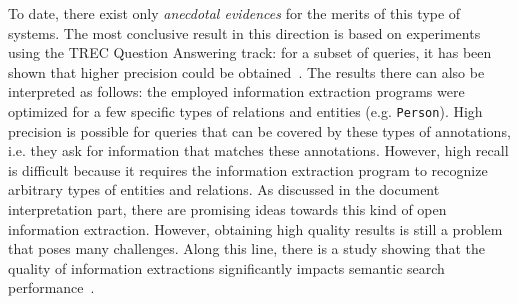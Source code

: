 To date, there exist only \emph{anecdotal evidences} for the merits of this type of systems. 
The most conclusive result in this direction is based on experiments using the TREC Question Answering track: for a subset of queries, it has been shown that higher precision could be obtained~\cite{DBLP:conf/sigir/Chu-CarrollPCFD06}. The results there can also be interpreted as follows: the employed information extraction programs were optimized for a few specific types of relations and entities (e.g. \verb+Person+). High precision is possible for queries that can be covered by these types of annotations, i.e. they ask for information that matches these annotations. However, high recall is difficult because it requires the information extraction program to recognize arbitrary types of entities and relations. As discussed in the document interpretation part, there are promising ideas towards this kind of open information extraction. However, obtaining high quality results is still a problem that poses many challenges. Along this line, there is a study showing that the quality of information extractions significantly impacts semantic search performance~\cite{DBLP:conf/cikm/Chu-CarrollP07}. 

